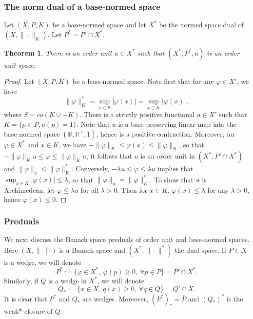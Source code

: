 \documentclass[12pt]{article}
\newtheorem{thm}{Theorem}
\theoremstyle{remark}
\newcommand{\<}{\langle}
\begin{document}
\subsubsection*{The norm dual of a base-normed space}

Let $(X,P,K)$ be a base-normed space and let $X^*$ be the normed space dual of $(X,\|\cdot\|_K)$. Let $P^*= P'\cap X^*$.

\begin{thm} There is an order unit $u\in X^*$ such that $(X^*,P^*,u)$  is an order unit space.  

\end{thm}

\begin{proof} Let $(X,P,K)$ be a base-normed space. Note first that for any $\varphi\in X'$, we have
\[
\|\varphi\|_K^*=\sup_{x\in S} |\varphi(x)|=\sup_{x\in K} |\varphi(x)|,
\]
where $S=co(K\cup -K)$. There is a strictly positive functional $u\in X'$ such that 
$K=\{p\in P, u(p)=1\}$. Note that $u$ is a base-preserving linear map into the base-normed space $(\mathbb R,\mathbb R^+,1)$, hence 
is a positive contraction. Moreover, for  $\varphi\in X^*$ and $x\in K$, we have
$-\|\varphi\|_K\le \varphi(x)\le \|\varphi\|_K$, so that $-\|\varphi\|_Ku\le \varphi\le \|\varphi\|_Ku$, it follows that $u$ is an order unit in $(X^*, P'\cap X^*)$ and $\|\varphi\|_u\le \|\varphi\|_K^*$. Conversely,  $-\lambda u\le \varphi\le \lambda u$ 
implies that $\sup_{x\in K}|\varphi(x)|\le \lambda$, so that $\|\varphi\|_u= \|\varphi\|_K^*$. To show that $u$ is Archimedean, 
 let $\varphi\le \lambda u$ for all $\lambda>0$. Then for $x\in K$, $\varphi(x)\le \lambda$ for any $\lambda>0$, hence $\varphi(x)\le 0$. 

\end{proof}




\subsubsection*{Preduals}

We next discuss the Banach space preduals of order unit and base-normed spaces. Here $(X,\|\cdot\|)$ is a Banach space and $(X^*,\|\cdot\|^*)$ the dual space.  If $P\in X$ is a wedge, we will denote 
\[
P^*:=\{\varphi\in X^*,\ \varphi(p)\ge 0,\ \forall p\in P\}= P'\cap X^*.
\]
Similarly, if $Q$ is a wedge in $X^*$, we will denote 
\[
Q_*:=\{x\in X,\ q(x)\ge 0,\ \forall q\in Q\}= Q'\cap X.
\]
It is clear that $P^*$ and $Q_*$ are wedges. Moreover, $(P^*)_*=\bar P$ and $(Q_*)^*$ is the weak*-closure of $Q$. 
\end{document}
